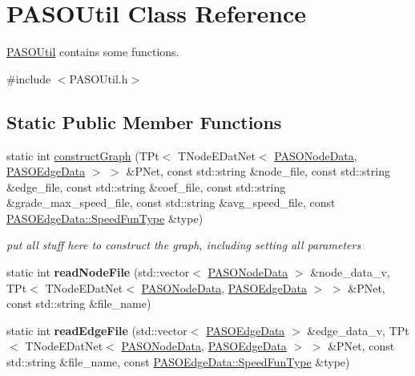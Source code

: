 \hypertarget{class_p_a_s_o_util}{}\section{P\+A\+S\+O\+Util Class Reference}
\label{class_p_a_s_o_util}


\hyperlink{class_p_a_s_o_util}{P\+A\+S\+O\+Util} contains some functions.  




{\ttfamily \#include $<$P\+A\+S\+O\+Util.\+h$>$}

\subsection*{Static Public Member Functions}
\begin{DoxyCompactItemize}
\item 
static int \hyperlink{class_p_a_s_o_util_a4b10b060f12d502b21177cca0f2b078a}{construct\+Graph} (T\+Pt$<$ T\+Node\+E\+Dat\+Net$<$ \hyperlink{class_p_a_s_o_node_data}{P\+A\+S\+O\+Node\+Data}, \hyperlink{class_p_a_s_o_edge_data}{P\+A\+S\+O\+Edge\+Data} $>$ $>$ \&P\+Net, const std\+::string \&node\+\_\+file, const std\+::string \&edge\+\_\+file, const std\+::string \&coef\+\_\+file, const std\+::string \&grade\+\_\+max\+\_\+speed\+\_\+file, const std\+::string \&avg\+\_\+speed\+\_\+file, const \hyperlink{class_p_a_s_o_edge_data_a30164e651874b10a410d96616c7b4077}{P\+A\+S\+O\+Edge\+Data\+::\+Speed\+Fun\+Type} \&type)
\begin{DoxyCompactList}\small\item\em put all stuff here to construct the graph, including setting all parameters \end{DoxyCompactList}\item 
\hypertarget{class_p_a_s_o_util_aa574b984becc3f01a866a2ac618a447d}{}static int {\bfseries read\+Node\+File} (std\+::vector$<$ \hyperlink{class_p_a_s_o_node_data}{P\+A\+S\+O\+Node\+Data} $>$ \&node\+\_\+data\+\_\+v, T\+Pt$<$ T\+Node\+E\+Dat\+Net$<$ \hyperlink{class_p_a_s_o_node_data}{P\+A\+S\+O\+Node\+Data}, \hyperlink{class_p_a_s_o_edge_data}{P\+A\+S\+O\+Edge\+Data} $>$ $>$ \&P\+Net, const std\+::string \&file\+\_\+name)\label{class_p_a_s_o_util_aa574b984becc3f01a866a2ac618a447d}

\item 
\hypertarget{class_p_a_s_o_util_ac03b1d8019a574e7b8d817b0cc194d42}{}static int {\bfseries read\+Edge\+File} (std\+::vector$<$ \hyperlink{class_p_a_s_o_edge_data}{P\+A\+S\+O\+Edge\+Data} $>$ \&edge\+\_\+data\+\_\+v, T\+Pt$<$ T\+Node\+E\+Dat\+Net$<$ \hyperlink{class_p_a_s_o_node_data}{P\+A\+S\+O\+Node\+Data}, \hyperlink{class_p_a_s_o_edge_data}{P\+A\+S\+O\+Edge\+Data} $>$ $>$ \&P\+Net, const std\+::string \&file\+\_\+name, const \hyperlink{class_p_a_s_o_edge_data_a30164e651874b10a410d96616c7b4077}{P\+A\+S\+O\+Edge\+Data\+::\+Speed\+Fun\+Type} \&type)\label{class_p_a_s_o_util_ac03b1d8019a574e7b8d817b0cc194d42}


\end{DoxyCompactItemize}
